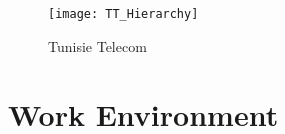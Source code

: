 \begin{figure}[ht!] %
  \centering
  \texttt{[image: TT\_Hierarchy]}
  \caption[Where I Did the Internship]{Tunisie Telecom }%
  \label{fig:test1}
\end{figure}













\section{Work Environment}
\blindtext